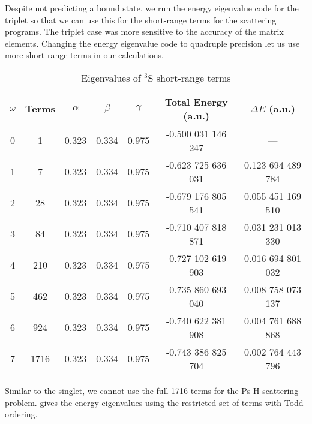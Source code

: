 \documentclass[Dissertation.tex]{subfiles}
\begin{document}
Despite not predicting a bound state, we run the energy eigenvalue code for 
the triplet so that we can use this for the short-range terms for the 
scattering programs. The triplet case was more sensitive to the accuracy of 
the matrix elements. Changing the energy eigenvalue code to quadruple 
precision let us use more short-range terms in our calculations.


\setlength{\abovecaptionskip}{6pt}   %
\setlength{\belowcaptionskip}{6pt}   %
\begin{table}
\centering
\begin{tabular}{c c c c c c c}
\toprule
$\omega$ & Terms & $\alpha$ & $\beta$ & $\gamma$ & Total Energy (a.u.) & $\Delta E$ (a.u.) \\ [0.5ex]
\midrule
0 & 1    & 0.323 & 0.334 & 0.975 & -0.500 031 146 247 & --- \\
1 & 7    & 0.323 & 0.334 & 0.975 & -0.623 725 636 031 & 0.123 694 489 784 \\
2 & 28   & 0.323 & 0.334 & 0.975 & -0.679 176 805 541 & 0.055 451 169 510 \\
3 & 84   & 0.323 & 0.334 & 0.975 & -0.710 407 818 871 & 0.031 231 013 330 \\
4 & 210  & 0.323 & 0.334 & 0.975 & -0.727 102 619 903 & 0.016 694 801 032 \\
5 & 462  & 0.323 & 0.334 & 0.975 & -0.735 860 693 040 & 0.008 758 073 137 \\
6 & 924  & 0.323 & 0.334 & 0.975 & -0.740 622 381 908 & 0.004 761 688 868 \\
7 & 1716 & 0.323 & 0.334 & 0.975 & -0.743 386 825 704 & 0.002 764 443 796 \\
\bottomrule
\end{tabular}
\caption{Eigenvalues of $^3$S short-range terms}
\label{tab:BoundEnergy3}
\end{table}

Similar to the singlet, we cannot use the full 1716 
terms for the Ps-H scattering problem.  gives the 
energy eigenvalues using the restricted set of terms with Todd ordering. 
\end{document}
